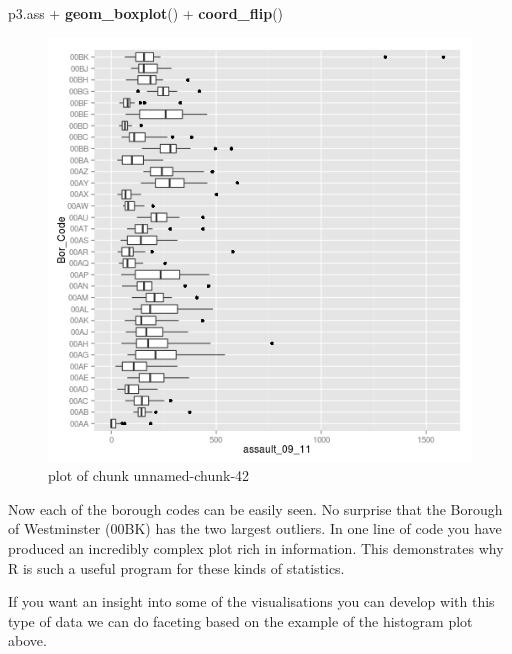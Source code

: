 \documentclass[]{article}
\makeatletter
\newenvironment{Shaded}{}{}
\newcommand{\KeywordTok}[1]{\textcolor[rgb]{0.00,0.44,0.13}{\textbf{{#1}}}}
\newcommand{\NormalTok}[1]{{#1}}
\def\maxwidth{\ifdim\Gin@nat@width>\linewidth\linewidth
\else\Gin@nat@width\fi}
\let\Oldincludegraphics\includegraphics
\renewcommand{\includegraphics}[1]{\Oldincludegraphics[width=\maxwidth]{#1}}
\makeatother
\begin{document}
\begin{Shaded}
\begin{Highlighting}[]
\NormalTok{p3.ass + }\KeywordTok{geom_boxplot}\NormalTok{() + }\KeywordTok{coord_flip}\NormalTok{()}
\end{Highlighting}
\end{Shaded}
\begin{figure}[htbp]
\centering
\includegraphics{figure/unnamed-chunk-42.png}
\caption{plot of chunk unnamed-chunk-42}
\end{figure}

Now each of the borough codes can be easily seen. No surprise that the
Borough of Westminster (00BK) has the two largest outliers. In one line
of code you have produced an incredibly complex plot rich in
information. This demonstrates why R is such a useful program for these
kinds of statistics.

If you want an insight into some of the visualisations you can develop
with this type of data we can do faceting based on the example of the
histogram plot above.
\end{document}
